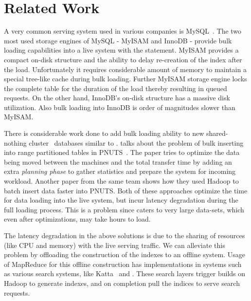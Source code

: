 \section{Related Work}
\label{sec:related_work}

A very common serving system used in various companies is MySQL~\cite{mysql}.
The two most used storage engines of MySQL - MyISAM and InnoDB - provide bulk
loading capabilities into a live system with the 
statement. MyISAM provides a compact on-disk structure and the ability to delay
re-creation of the index after the load.  Unfortunately it requires
considerable amount of memory to maintain a special tree-like cache during bulk
loading. Further MyISAM storage engine locks the complete table for the
duration of the load thereby resulting in queued requests. On the other hand,
InnoDB's on-disk structure has a massive disk utilization. Also bulk loading
into InnoDB is order of magnitudes slower than MyISAM. 

There is considerable work done to add bulk loading ability to new
shared-nothing cluster~\cite{sharednothing} databases similar to \projectname{}.
\citet{silberstein} talks about the problem of bulk inserting into range
partitioned tables in PNUTS~\cite{pnuts}. The paper tries to optimize the data
being moved between the machines and the total transfer time by adding an extra
\emph {planning phase} to gather statistics and prepare the system for incoming
workload. Another paper from the same team \citet{pnutsbatch} shows how they
used Hadoop to batch insert data faster into PNUTS. Both of these approaches
optimize the time for data loading into the live system, but incur latency
degradation during the full loading process. This is a problem since
\projectname{} caters to very large data-sets, which even after optimizations,
may take hours to load.  

The latency degradation in the above solutions is due to the sharing of
resources (like CPU and memory) with the live serving traffic. We can alleviate
this problem by offloading the construction of the indexes to an offline
system. Usage of MapReduce for this offline construction has implementations in
systems such as various search systems, like Katta~\cite{katta} and
\citet{mika}. These search layers trigger builds on Hadoop to generate indexes,
and on completion pull the indices to serve search requests. 

